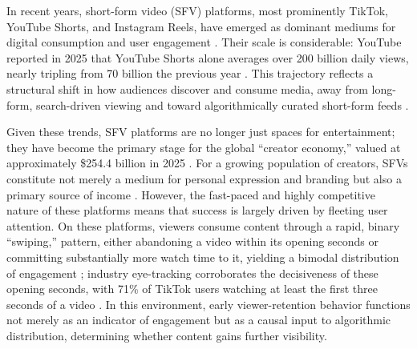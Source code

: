  

In recent years, short-form video (SFV) platforms, most prominently TikTok, YouTube Shorts, and Instagram Reels, have emerged as dominant mediums for digital consumption and user engagement \cite{faverio_2025_teens}. Their scale is considerable: YouTube reported in 2025 that YouTube Shorts alone averages over 200 billion daily views, nearly tripling from 70 billion the previous year \cite{cobb_2025_youtube}. This trajectory reflects a structural shift in how audiences discover and consume media, away from long-form, search-driven viewing and toward algorithmically curated short-form feeds \cite{gottfried_2025_americans, lafayette_2025_the}.

Given these trends, SFV platforms are no longer just spaces for entertainment; they have become the primary stage for the global ``creator economy,'' valued at approximately \$254.4 billion in 2025 \cite{zoting_2026_creator}. For a growing population of creators, SFVs constitute not merely a medium for personal expression and branding but also a primary source of income \cite{violot2024shorts, varanasi_2025_tiktok}. However, the fast-paced and highly competitive nature of these platforms means that success is largely driven by fleeting user attention. On these platforms, viewers consume content through a rapid, binary ``swiping,'' pattern, either abandoning a video within its opening seconds or committing substantially more watch time to it, yielding a bimodal distribution of engagement \cite{li2024delving, sun2025engagement}; industry eye-tracking corroborates the decisiveness of these opening seconds, with 71\% of TikTok users watching at least the first three seconds of a video \cite{eyesee_2023_tap}. In this environment, early viewer-retention behavior functions not merely as an indicator of engagement but as a causal input to algorithmic distribution, determining whether content gains further visibility.

